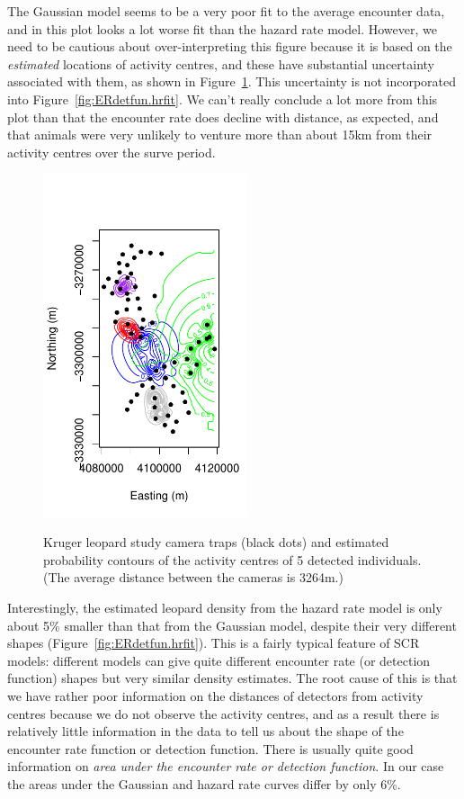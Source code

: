\documentclass[graybox,envcountchap,sectrefs]{SpringerStyleFiles/styles/svmono}\usepackage[]{graphicx}\usepackage[]{color}
\begin{document}
The Gaussian model seems to be a very poor fit to the average encounter data, and in this plot looks a lot worse fit than the hazard rate model. However, we need to be cautious about over-interpreting this figure because it is based on the \textit{estimated} locations of activity centres, and these have substantial uncertainty associated with them, as shown in Figure~\ref{fig:ERdetfun-locest}. This uncertainty is not incorporated into Figure~\ref{fig:ERdetfun.hrfit}. We can't really conclude a lot more from this plot than that the encounter rate does decline with distance, as expected, and that animals were very unlikely to venture more than about 15km from their activity centres over the surve period.

\begin{figure}[ht]
\caption{\small Kruger leopard study camera traps (black dots) and estimated probability contours of the activity centres of 5 detected individuals. (The average distance between the cameras is 3264m.)}
\centering
\vspace{-24pt}
\includegraphics[width=6cm]{keepfigure/ERdetfun-locest.pdf}
\label{fig:ERdetfun-locest}
\end{figure}

Interestingly, the estimated leopard density from the hazard rate model is only about 5\% smaller than that from the Gaussian model, despite their very different shapes (Figure~\ref{fig:ERdetfun.hrfit}). This is a fairly typical feature of SCR models: different models can give quite different encounter rate (or detection function) shapes but very similar density estimates. The root cause of this is that  we have rather poor information on the distances of detectors from activity centres because we do not observe the activity centres, and as a result there is relatively little information in the data to tell us about the shape of the encounter rate function or detection function. There is usually quite good information on \textit{area under the encounter rate or detection function}. In our case the areas under the Gaussian and hazard rate curves differ by only 6\%. 
\end{document}
